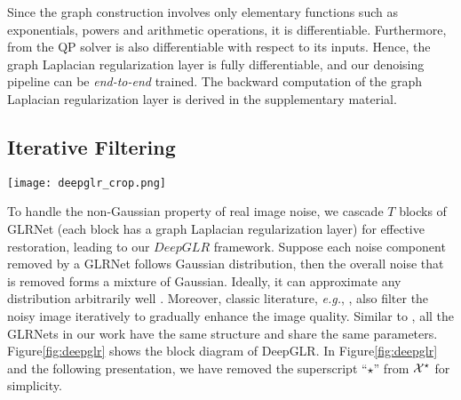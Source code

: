 \documentclass[10pt,twocolumn,letterpaper]{article}
\begin{document}
Since the graph construction involves only elementary functions such as exponentials, powers and arithmetic operations, it is differentiable. 
Furthermore, from \cite{amos2017optnet} the QP solver is also differentiable with respect to its inputs. 
Hence, the graph Laplacian regularization layer is fully differentiable, and our denoising pipeline can be {\it end-to-end} trained. 
The backward computation of the graph Laplacian regularization layer is derived in the supplementary material.

\subsection{Iterative Filtering}\label{ssec:iter}
%
\begin{figure*}[t]
\centering
    \texttt{[image: deepglr\_crop.png]}
\caption{Block diagram of the overall DeepGLR framework.}
\label{fig:deepglr}
\end{figure*}
%
To handle the non-Gaussian property of real image noise, we cascade $T$ blocks of GLRNet (each block has a graph Laplacian regularization layer) for effective restoration, leading to our $DeepGLR$ framework.
Suppose each noise component removed by a GLRNet follows Gaussian distribution, then the overall noise that is removed forms a mixture of Gaussian. 
Ideally, it can approximate any distribution arbitrarily well \cite{reynolds2015gaussian}. 
Moreover, classic literature, {\it e.g.}, \cite{elad2006image,milanfar2013tour,dabov2007image}, also filter the noisy image iteratively to gradually enhance the image quality. 
Similar to \cite{vemulapalli2016deep}, all the GLRNets in our work have the same structure and share the same parameters. 
Figure\;\ref{fig:deepglr} shows the block diagram of DeepGLR. 
In Figure\;\ref{fig:deepglr} and the following presentation, we have removed the superscript ``$\star$'' from ${\cal X}^{\star}$ for simplicity.
\end{document}
